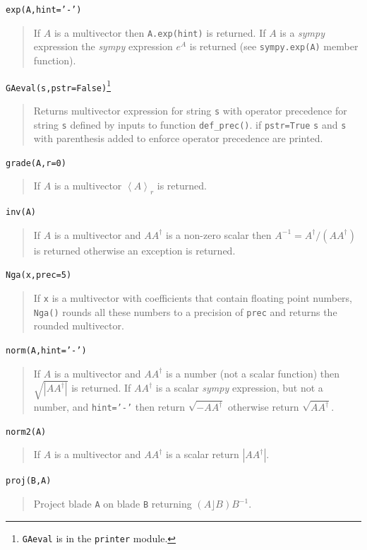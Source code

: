 \documentclass[12pt]{report}
\newcommand{\lp}{\left (}
\newcommand{\rp}{\right )}
\newcommand{\abs}[1]{\left |{#1}\right |}
\newcommand{\R}{\dagger}
\newcommand{\grade}[1]{\left < {#1} \right >}
\newcommand{\paren}[1]{\lp {#1} \rp}
\newcommand{\T}[1]{\texttt{#1}}
\begin{document}
\T{exp(A,hint='-')}
\begin{quote}
    If $A$ is a multivector then \T{A.exp(hint)} is returned.  If $A$ is a \emph{sympy}
    expression the \emph{sympy}     expression $e^{A}$ is returned (see \T{sympy.exp(A)} member function).
\end{quote}

\T{GAeval(s,pstr=False)}\footnote{\T{GAeval} is in the \T{printer} module.\label{fn_6}}
\begin{quote}
   Returns multivector expression for string \T{s} with operator precedence for
   string \T{s} defined by inputs to function \T{def\_prec()}.  if \T{pstr=True}
   \T{s} and \T{s} with parenthesis added to enforce operator precedence are printed.
\end{quote}

\T{grade(A,r=0)}
\begin{quote}
    If $A$ is a multivector $\grade{A}_{r}$ is returned.
\end{quote}

\T{inv(A)}
\begin{quote}
   If $A$ is a multivector and $AA^{\R}$ is a non-zero scalar then $A^{-1} = A^{\R}/(AA^{\R})$ is returned
   otherwise an exception is returned.
\end{quote}

\T{Nga(x,prec=5)}
\begin{quote}
   If \T{x} is a multivector with coefficients that contain floating point numbers, \T{Nga()}
   rounds all these numbers to a precision of \T{prec} and returns the rounded multivector.
\end{quote}

\T{norm(A,hint='-')}
\begin{quote}
    If $A$ is a multivector and $AA^{\R}$ is a number (not a scalar function) then $\sqrt{\abs{AA^{\R}}}$ is returned.
    If $AA^{\R}$ is a scalar \emph{sympy} expression, but not a number, and \T{hint='-'} then return  $\sqrt{-AA^{\R}}$ otherwise return
    $\sqrt{AA^{\R}}$.
\end{quote}

\T{norm2(A)}
\begin{quote}
    If $A$ is a multivector and $AA^{\R}$ is a scalar return $\abs{AA^{\R}}$.
\end{quote}

\T{proj(B,A)}
\begin{quote}
   Project blade \T{A} on blade \T{B} returning $\paren{A\rfloor B}B^{-1}$.
\end{quote}
\end{document}

